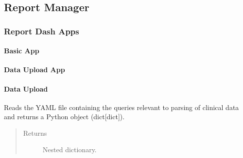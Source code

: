 \documentclass[letterpaper,10pt,english]{sphinxmanual}
\begin{document}
\subsection{Report Manager}
\label{\detokenize{_autosummary/report_manager:report-manager}}\label{\detokenize{_autosummary/report_manager::doc}}

\subsubsection{Report Dash Apps}
\label{\detokenize{_autosummary/report_manager.apps:report-dash-apps}}\label{\detokenize{_autosummary/report_manager.apps::doc}}

\paragraph{Basic App}
\label{\detokenize{_autosummary/report_manager.apps:basic-app}}

\paragraph{Data Upload App}
\label{\detokenize{_autosummary/report_manager.apps:data-upload-app}}

\paragraph{Data Upload}
\label{\detokenize{_autosummary/report_manager.apps:module-report_manager.apps.dataUpload}}\label{\detokenize{_autosummary/report_manager.apps:data-upload}}

\begin{fulllineitems}
\label{\detokenize{_autosummary/report_manager.apps:report_manager.apps.dataUpload.get_data_upload_queries}}
Reads the YAML file containing the queries relevant to parsing of clinical data and     returns a Python object (dict{[}dict{]}).
\begin{quote}\begin{description}
\item[{Returns}] \leavevmode
Nested dictionary.

\end{description}\end{quote}

\end{fulllineitems}
\end{document}
